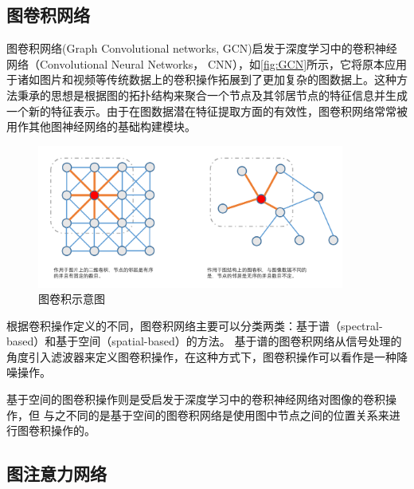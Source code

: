 \subsection{图卷积网络}
图卷积网络(Graph Convolutional networks, GCN)启发于深度学习中的卷积神经网络（Convolutional Neural Networks， CNN），如\autoref{fig:GCN}所示，它将原本应用于诸如图片和视频等传统数据上的卷积操作拓展到了更加复杂的图数据上。这种方法秉承的思想是根据图的拓扑结构来聚合一个节点及其邻居节点的特征信息并生成一个新的特征表示。由于在图数据潜在特征提取方面的有效性，图卷积网络常常被用作其他图神经网络的基础构建模块。
\begin{figure}[htb]
    \includegraphics[width=0.9\textwidth]{fig/GCN.pdf}
    \caption{图卷积示意图}
    \label{fig:GCN}
  \end{figure}
根据卷积操作定义的不同，图卷积网络主要可以分类两类：基于谱（spectral-based）和基于空间（spatial-based）的方法。
基于谱的图卷积网络从信号处理的角度引入滤波器来定义图卷积操作，在这种方式下，图卷积操作可以看作是一种降噪操作。

基于空间的图卷积操作则是受启发于深度学习中的卷积神经网络对图像的卷积操作，但 与之不同的是基于空间的图卷积网络是使用图中节点之间的位置关系来进行图卷积操作的。

\subsection{图注意力网络}

